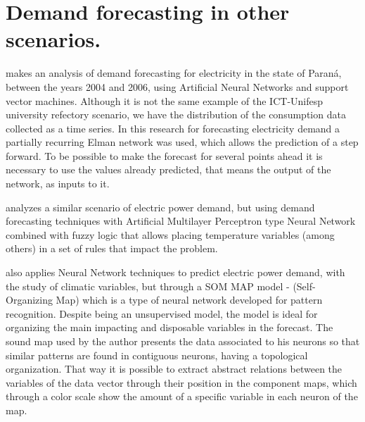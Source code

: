    \section{Demand forecasting in other scenarios.}
        makes an analysis of demand forecasting for electricity in the state of Paraná, between the years 2004 and 2006, using Artificial Neural Networks and support vector machines. Although it is not the same example of the ICT-Unifesp university refectory scenario, we have the distribution of the consumption data collected as a time series. In this research for forecasting electricity demand a partially recurring Elman network was used, which allows the prediction of a step forward. To be possible to make the forecast for several points ahead it is necessary to use the values already predicted, that means the output of the network, as inputs to it.
        
         analyzes a similar scenario of electric power demand, but using demand forecasting techniques with Artificial Multilayer Perceptron type Neural Network combined with fuzzy logic that allows placing temperature variables (among others) in a set of rules that impact the problem.
        
         also applies Neural Network techniques to predict electric power demand, with the study of climatic variables, but through a SOM MAP model - (Self-Organizing Map) which is a type of neural network developed for pattern recognition. Despite being an unsupervised model, the model is ideal for organizing the main impacting and disposable variables in the forecast. The sound map used by the author presents the data associated to his neurons so that similar patterns are found in contiguous neurons, having a topological organization. That way it is possible to extract abstract relations between the variables of the data vector through their position in the component maps, which through a color scale show the amount of a specific variable in each neuron of the map.